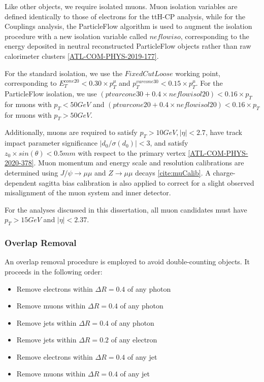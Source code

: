 Like other objects, we require isolated muons. Muon isolation variables are defined identically to those of electrons for the ttH-CP analysis, while for the Couplings analysis, the ParticleFlow algorithm is used to augment the isolation procedure with a new isolation variable called $neflowiso$, corresponding to the energy deposited in neutral reconstructed ParticleFlow objects rather than raw calorimeter clusters \ref{ATL-COM-PHYS-2019-177}. 

For the standard isolation, we use the $FixedCutLoose$ working point, corresponding to $E_{T}^{cone20}<0.30 \times p_{T}^{\mu}$ and $p_{T}^{varcone30}<0.15 \times p_{T}^{\mu}$. For the ParticleFlow isolation, we use $(ptvarcone30+ 0.4\times neflowisol20) <0.16 \times p_{T}$ for muons with $p_{T} < 50GeV$ and $(ptvarcone20+ 0.4\times neflowisol20) < 0.16 \times p_{T}$ for muons with $p_{T} > 50GeV$.

Additionally, muons are required to satisfy $p_{T} > 10 GeV, |\eta| < 2.7$, have track impact parameter significance $|d_{0} / \sigma(d_{0})| < 3$, and satisfy $z_{0} \times sin(\theta) < 0.5 mm$ with respect to the primary vertex \ref{ATL-COM-PHYS-2020-378}. Muon momentum and energy scale and resolution calibrations are determined using $J/\psi \rightarrow \mu \mu$ and $Z \rightarrow \mu \mu$ decays \ref{cite:muCalib}. A charge-dependent sagitta bias calibration is also applied to correct for a slight observed misalignment of the muon system and inner detector.

For the analyses discussed in this dissertation, all muon candidates must have $p_{T} > 15 GeV$ and $|\eta| < 2.37$.
 
\subsubsection{Overlap Removal} \label{sec:Overlap}

An overlap removal procedure is employed to avoid double-counting objects. It proceeds in the following order:

\begin{itemize}
\item Remove electrons within $\Delta R=0.4$ of any photon
\item Remove muons within $\Delta R=0.4$ of any photon
\item Remove jets within $\Delta R=0.4$ of any photon
\item Remove jets within $\Delta R=0.2$ of any electron
\item Remove electrons within $\Delta R=0.4$ of any jet
\item Remove muons within $\Delta R=0.4$ of any jet
\end{itemize}

